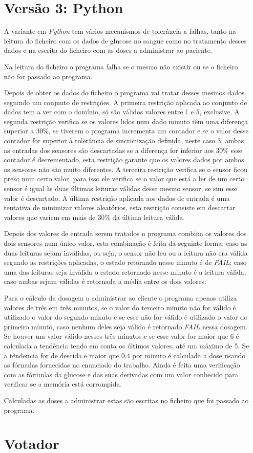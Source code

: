 \section{Versão 3: Python}
\label{sec:versao3_python}
A variante em \textit{Python} tem vários mecanismos de tolerância a falhas, tanto na leitura do ficheiro com os dados
de glucose no sangue como no tratamento desses dados e na escrita do ficheiro com as doses a administrar ao paciente.\par
Na leitura do ficheiro o programa falha se o mesmo não existir ou se o ficheiro não for passado ao programa.\par
Depois de obter os dados do ficheiro o programa vai tratar desses mesmos dados seguindo um conjunto de restrições.
A primeira restrição aplicada ao conjunto de dados tem a ver com o domínio, só são válidos valores entre 1 e 5, exclusive.
A segunda restrição verifica se os valores lidos num dado minuto têm uma diferença superior a 30\%, se tiverem o programa
incrementa um contador e se o valor desse contador for superior à tolerância de sincronização definida, neste caso 3,
ambas as entradas dos sensores são descartadas se a diferença for inferior aos 30\% esse contador é decrementado, esta
restrição garante que os valores dados por ambos os sensores não são muito diferentes.
A terceira restrição verifica se o sensor ficou preso num certo valor, para isso ele verifica se o valor que está a ler
de um certo sensor é igual às duas últimas leituras válidas desse mesmo sensor, se sim esse valor é descartado.
A última restrição aplicada aos dados de entrada é uma tentativa de minimizar valores aleatórios, esta restrição
consiste em descartar valores que variem em mais de 30\% da última leitura válida.\par
Depois dos valores de entrada serem tratados o programa combina os valores dos dois sensores num único valor, esta
combinação é feita da seguinte forma: caso as duas leituras sejam inválidas, ou seja, o sensor não leu ou a leitura não
era válida segundo as restrições aplicadas, o estado retornado nesse minuto é de \textit{FAIL}; caso uma das leituras seja
inválida o estado retornado nesse minuto é a leitura válida; caso ambas sejam válidas é retornada a média entre os dois
valores.\par
Para o cálculo da dosagem a administrar ao cliente o programa apenas utiliza valores de três em três minutos, se o valor
do terceiro minuto não for válido é utilizado o valor do segundo minuto e se esse não for válido é utilizado o valor do
primeiro minuto, caso nenhum deles seja válido é retornado \textit{FAIL} nessa dosagem. Se houver um valor válido nesses
três minutos e se esse valor for maior que 6 é calculada a tendência tendo em conta os últimos valores, até um máximo
de 5. Se a têndencia for de descida e maior que 0.4 por minuto é calculada a dose usando as fórmulas fornecidas no
enunciado do trabalho. Ainda é feita uma verificação com as fórmulas da glucose e das suas derivadas com um valor
conhecido para verificar se a memória está corrompida.\par
Calculadas as doses a administrar estas são escritas no ficheiro que foi passado ao programa.

\section{Votador}
\label{sec:votador}
